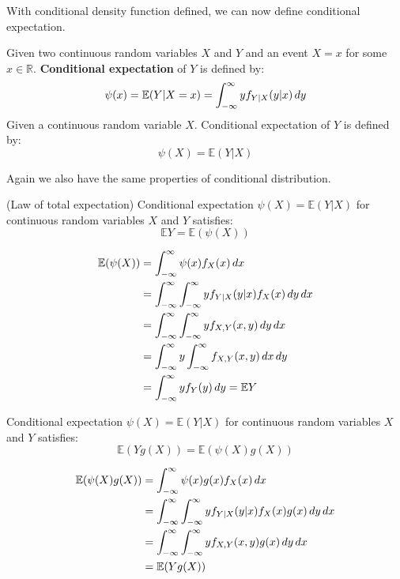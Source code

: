 \documentclass{huhtakm-template-book}
\newcommand{\expect}{\mathbb{E}}
\begin{document}
With conditional density function defined, we can now define conditional expectation.
\begin{defn}
	Given two continuous random variables $X$ and $Y$ and an event $X=x$ for some $x\in\mathbb{R}$. \textbf{Conditional expectation} of $Y$ is defined by:
	\begin{equation*}
		\psi(x)=\expect(Y|X=x)=\intinfty yf_{Y|X}(y|x)\,dy
	\end{equation*}
	Given a continuous random variable $X$. Conditional expectation of $Y$ is defined by:
	\begin{equation*}
		\psi(X)=\expect(Y|X)
	\end{equation*}
\end{defn}

\newpage
Again we also have the same properties of conditional distribution.
\begin{lem}(Law of total expectation) 
	Conditional expectation $\psi(X)=\expect(Y|X)$ for continuous random variables $X$ and $Y$ satisfies:
	\begin{equation*}
		\expect Y=\expect(\psi(X))
	\end{equation*}
\end{lem}
\begin{proofing}
	\begin{align*}
		\expect(\psi(X))&=\intinfty\psi(x)f_{X}(x)\,dx\\
		&=\intinfty\intinfty yf_{Y|X}(y|x)f_{X}(x)\,dy\,dx\\
		&=\intinfty\intinfty yf_{X,Y}(x,y)\,dy\,dx\\
		&=\intinfty y\intinfty f_{X,Y}(x,y)\,dx\,dy\\
		&=\intinfty yf_{Y}(y)\,dy=\expect Y
	\end{align*}
\end{proofing}
\begin{lem}
	Conditional expectation $\psi(X)=\expect(Y|X)$ for continuous random variables $X$ and $Y$ satisfies:
	\begin{equation*}
		\expect(Yg(X))=\expect(\psi(X)g(X))
	\end{equation*}
\end{lem}
\begin{proofing}
	\begin{align*}
		\expect(\psi(X)g(X))&=\intinfty\psi(x)g(x)f_{X}(x)\,dx\\
		&=\intinfty\intinfty yf_{Y|X}(y|x)f_{X}(x)g(x)\,dy\,dx\\
		&=\intinfty\intinfty yf_{X,Y}(x,y)g(x)\,dy\,dx\\
		&=\expect(Yg(X))
	\end{align*}
\end{proofing}
\end{document}
